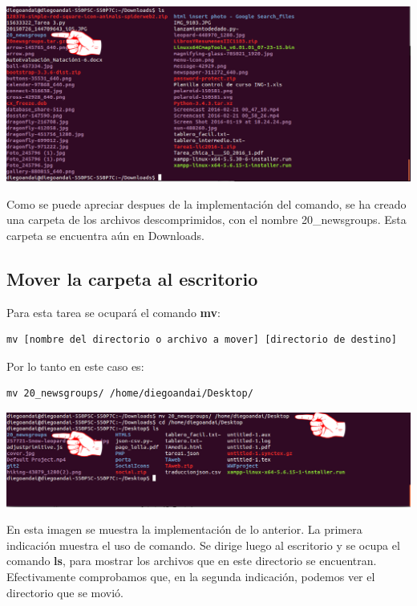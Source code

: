 \documentclass[a4paper,11pt]{article}
\theoremstyle{mytheor}
\begin{document}
\begin{center}
\includegraphics[scale=0.385]{tc1_4.png}
\end{center}

Como se puede apreciar despues de la implementación del comando, se ha creado una carpeta de los archivos descomprimidos, con el nombre 20\_newsgroups. Esta carpeta se encuentra aún en Downloads.

\subsection{Mover la carpeta al escritorio}

Para esta tarea se ocupará el comando \textbf{mv}:

\begin{lstlisting}
mv [nombre del directorio o archivo a mover] [directorio de destino]
\end{lstlisting}

Por lo tanto en este caso es:

\begin{lstlisting}
mv 20_newsgroups/ /home/diegoandai/Desktop/
\end{lstlisting}

\begin{center}
\includegraphics[scale=0.385]{tc1_5.png}
\end{center}

En esta imagen se muestra la implementación de lo anterior. La primera indicación muestra el uso de comando. Se dirige luego al escritorio y se ocupa el comando \textbf{ls}, para mostrar los archivos que en este directorio se encuentran. Efectivamente comprobamos que, en la segunda indicación, podemos ver el directorio que se movió.
\end{document}

